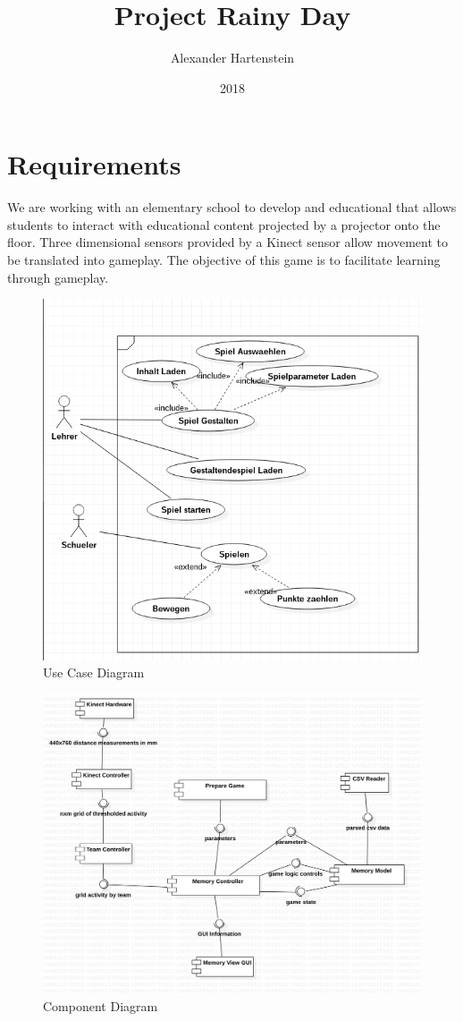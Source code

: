 \documentclass{article}
\title{Project Rainy Day}
\date{2018}
\author{Alexander Hartenstein}
\begin{document}
	\maketitle


	\section{Requirements}
	We are working with an elementary school to develop and educational that allows students to interact with educational content projected by a projector onto the floor. Three dimensional sensors provided by a Kinect sensor allow movement to be translated into gameplay. The objective of this game is to facilitate learning through gameplay.
	
	
	
	

	\begin{figure}[h!]
	  \centering
	    \includegraphics[width=\textwidth]{components/usecasediagram.png}
	    \caption{Use Case Diagram}
	    \label{fig:use_case_diagram}
	\end{figure}


	\begin{figure}[h!]
	  \centering
	    \includegraphics[width=\textwidth]{components/componentDiagram.png}
	    \caption{Component Diagram}
	    \label{fig:component_diagram}
	\end{figure}
\end{document}
